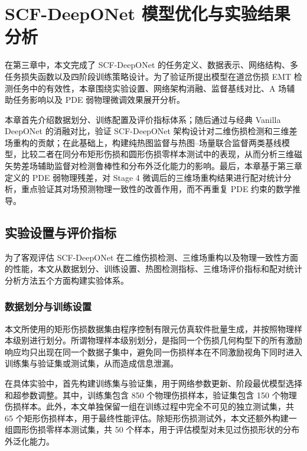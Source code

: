 \chapter{SCF-DeepONet 模型优化与实验结果分析}
\label{ch:experiment_analysis}

在第三章中，本文完成了 SCF-DeepONet 的任务定义、数据表示、网络结构、多任务损失函数以及四阶段训练策略设计。为了验证所提出模型在道岔伤损 EMT 检测任务中的有效性，本章围绕实验设置、网络架构消融、监督基线对比、A 场辅助任务影响以及 PDE 弱物理微调效果展开分析。

本章首先介绍数据划分、训练配置及评价指标体系；随后通过与经典 Vanilla DeepONet 的消融对比，验证 SCF-DeepONet 架构设计对二维伤损检测和三维差场重构的贡献；在此基础上，构建纯热图监督与热图--场量联合监督两类基线模型，比较二者在同分布矩形伤损和圆形伤损零样本测试中的表现，从而分析三维磁矢势差场辅助监督对检测鲁棒性和分布外泛化能力的影响。最后，本章基于第三章定义的 PDE 弱物理残差，对 Stage 4 微调后的三维场重构结果进行配对统计分析，重点验证其对场预测物理一致性的改善作用，而不再重复 PDE 约束的数学推导。

\section{实验设置与评价指标}
\label{sec:experimental_setup}

为了客观评估 SCF-DeepONet 在二维伤损检测、三维场重构以及物理一致性方面的性能，本文从数据划分、训练设置、热图检测指标、三维场评价指标和配对统计分析方法五个方面构建实验体系。

\subsection{数据划分与训练设置}
\label{subsec:data_split}

本文所使用的矩形伤损数据集由程序控制有限元仿真软件批量生成，并按照物理样本级别进行划分。所谓物理样本级别划分，是指同一个伤损几何构型下的所有激励响应均只出现在同一个数据子集中，避免同一伤损样本在不同激励视角下同时进入训练集与验证集或测试集，从而造成信息泄漏。

在具体实验中，首先构建训练集与验证集，用于网络参数更新、阶段最优模型选择和超参数调整。其中，训练集包含 850 个物理伤损样本，验证集包含 150 个物理伤损样本。此外，本文单独保留一组在训练过程中完全不可见的独立测试集，共 65 个矩形伤损样本，用于最终性能评估。除矩形伤损测试外，本文还额外构建一组圆形伤损零样本测试集，共 50 个样本，用于评估模型对未见过伤损形状的分布外泛化能力。

